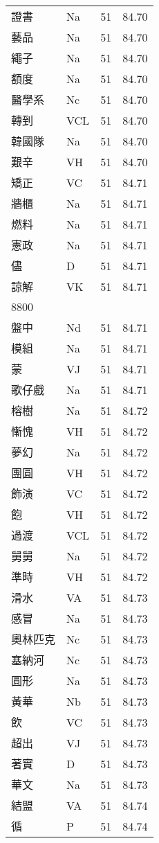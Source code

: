 \documentclass[twocolumn]{book}
\begin{document}
\begin{supertabular}{llrr}
證書 & Na & 51 &  84.70\\
藝品 & Na & 51 &  84.70\\
繩子 & Na & 51 &  84.70\\
額度 & Na & 51 &  84.70\\
醫學系 & Nc & 51 &  84.70\\
轉到 & VCL & 51 &  84.70\\
韓國隊 & Na & 51 &  84.70\\
艱辛 & VH & 51 &  84.70\\
矯正 & VC & 51 &  84.71\\
牆櫃 & Na & 51 &  84.71\\
燃料 & Na & 51 &  84.71\\
憲政 & Na & 51 &  84.71\\
儘 & D & 51 &  84.71\\
諒解 & VK & 51 &  84.71\\
8800\\
盤中 & Nd & 51 &  84.71\\
模組 & Na & 51 &  84.71\\
蒙 & VJ & 51 &  84.71\\
歌仔戲 & Na & 51 &  84.71\\
榕樹 & Na & 51 &  84.72\\
慚愧 & VH & 51 &  84.72\\
夢幻 & Na & 51 &  84.72\\
團圓 & VH & 51 &  84.72\\
飾演 & VC & 51 &  84.72\\
飽 & VH & 51 &  84.72\\
過渡 & VCL & 51 &  84.72\\
舅舅 & Na & 51 &  84.72\\
準時 & VH & 51 &  84.72\\
滑水 & VA & 51 &  84.73\\
感冒 & Na & 51 &  84.73\\
奧林匹克 & Nc & 51 &  84.73\\
塞納河 & Nc & 51 &  84.73\\
圓形 & Na & 51 &  84.73\\
黃華 & Nb & 51 &  84.73\\
飲 & VC & 51 &  84.73\\
超出 & VJ & 51 &  84.73\\
著實 & D & 51 &  84.73\\
華文 & Na & 51 &  84.73\\
結盟 & VA & 51 &  84.74\\
循 & P & 51 &  84.74\\

\end{supertabular}
\end{document}
